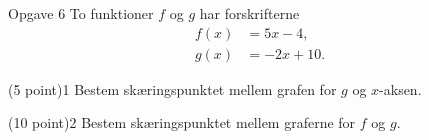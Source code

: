 \begin{opgavetekst}{Opgave 6}
	To funktioner $f$ og $g$ har forskrifterne 
	\begin{align*}
		f(x) &= 5x-4, \\
		g(x) &= -2x+10.
	\end{align*}
\end{opgavetekst}
\begin{delopgave}{(5 point)}{1}
	Bestem skæringspunktet mellem grafen for $g$ og $x$-aksen.
\end{delopgave}
\begin{delopgave}{(10 point)}{2}
	Bestem skæringspunktet mellem graferne for $f$ og $g$. 
\end{delopgave}